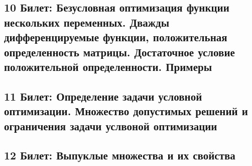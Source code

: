 \documentclass[14pt, letterpaper]{article}
\begin{document}
\newpage
\subsection{10 Билет: Безусловная оптимизация функции нескольких переменных. Дважды дифференцируемые функции, 
положительная определенность матрицы. Достаточное условие положительной определенности. Примеры}

\newpage
\subsection{11 Билет: Определение задачи условной оптимизации. Множество допустимых решений и ограничения задачи 
услвоной оптимизации}

\newpage
\subsection{12 Билет: Выпуклые множества и их свойства}
\end{document}
